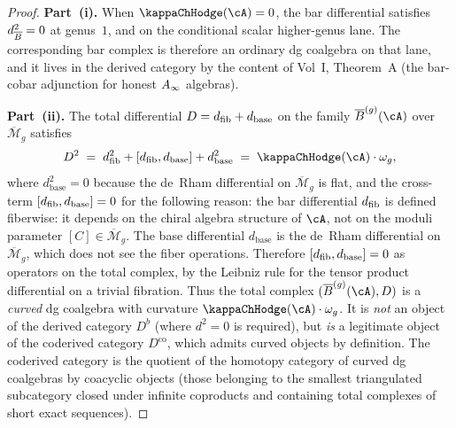 \begin{proof}
\textbf{Part~(i).}
When $\kappaChHodge(\cA) = 0$, the bar differential satisfies
$d_{\overline{B}}^2 = 0$ at genus~$1$, and on the conditional scalar
higher-genus lane. The corresponding bar complex is therefore an
ordinary dg coalgebra on that lane, and it lives in the derived
category by the content of Vol~I, Theorem~A (the bar-cobar adjunction
for honest $A_\infty$ algebras).

\textbf{Part~(ii).}
The total differential $D = d_{\mathrm{fib}} + d_{\mathrm{base}}$ on the
family $\barB^{(g)}(\cA)$ over $\overline{\mathcal M}_g$ satisfies
\[
 D^2 \;=\; \dfib^2 + [\dfib, d_{\mathrm{base}}]
 + d_{\mathrm{base}}^2
 \;=\; \kappaChHodge(\cA) \cdot \omega_g,
\]
where $d_{\mathrm{base}}^2 = 0$ because the de~Rham
differential on $\overline{\mathcal M}_g$ is flat, and the
cross-term $[d_{\mathrm{fib}}, d_{\mathrm{base}}] = 0$ for the following reason:
the bar differential $d_{\mathrm{fib}}$ is defined fiberwise: it depends on
the chiral algebra structure of $\cA$, not on the moduli parameter
$[C] \in \overline{\mathcal M}_g$. The base differential
$d_{\mathrm{base}}$ is the de~Rham differential on
$\overline{\mathcal M}_g$, which does not see the fiber operations.
Therefore $[d_{\mathrm{fib}}, d_{\mathrm{base}}] = 0$ as operators on the
total complex, by the Leibniz rule for the tensor product
differential on a trivial fibration. Thus the total
complex $(\barB^{(g)}(\cA), D)$ is a \emph{curved} dg coalgebra
with curvature $\kappaChHodge(\cA) \cdot \omega_g$. It is \emph{not} an
object of the derived category $D^b$ (where $d^2 = 0$ is required),
but \emph{is} a legitimate object of the coderived category
$D^{\mathrm{co}}$, which admits curved objects by definition. The
coderived category is the quotient of the homotopy category of curved
dg coalgebras by coacyclic objects (those belonging to the smallest
triangulated subcategory closed under infinite coproducts and
containing total complexes of short exact sequences).


\end{proof}
